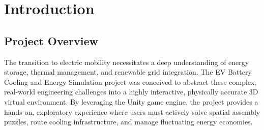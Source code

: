 \documentclass[12pt,a4paper,oneside]{report}
\begin{document}
\begin{abstract}
\noindent This exhaustive technical report documents the architecture, software engineering principles, and interactive design of a complex 3D simulation developed within the Unity Engine. The application serves as an educational and procedural training tool focused on the lifecycle and operational management of Electric Vehicle (EV) battery systems and their surrounding infrastructure. The software is distinctly segmented into three primary interactive environments (Unity Scenes): \textbf{The Main Scene}, which serves as a tactile workshop for physical component assembly and pipe welding; \textbf{The Cooling Scene}, an intricate simulation of fluid dynamics, spline routing, and thermal mitigation within an EV battery pack; and \textbf{The Solar Twin Scene}, a macroscopic digital twin that models renewable energy generation, facility-level battery storage, variable weather states, and dynamic load balancing. This document details the algorithmic foundations of the grid-snapping mechanics, the mathematics driving the thermal and energy simulations, the overarching progression systems (Quest and Timer modules), and the inter-scene communications that bind the project into a cohesive user experience.
\end{abstract}

\tableofcontents
\newpage

\chapter{Introduction}

\section{Project Overview}
The transition to electric mobility necessitates a deep understanding of energy storage, thermal management, and renewable grid integration. The EV Battery Cooling and Energy Simulation project was conceived to abstract these complex, real-world engineering challenges into a highly interactive, physically accurate 3D virtual environment. By leveraging the Unity game engine, the project provides a hands-on, exploratory experience where users must actively solve spatial assembly puzzles, route cooling infrastructure, and manage fluctuating energy economies.
\end{document}
